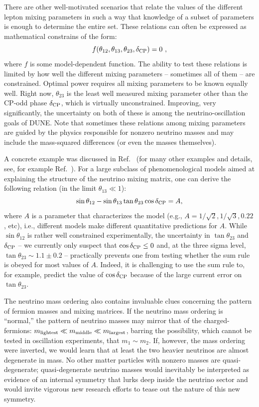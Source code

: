 There are other well-motivated scenarios that relate the values of the different lepton mixing parameters in such a way that knowledge of a subset of parameters is enough to determine the entire set. These relations can often be expressed as mathematical constrains of the form:
\begin{equation}
f(\theta_{12},\theta_{13}, \theta_{23}, \delta_{\rm CP})=0~,
\end{equation}
where $f$ is some model-dependent function. The ability to test these relations is limited by how well the different mixing parameters -- sometimes all of them -- are constrained. Optimal power requires all mixing parameters to be known equally well. Right now, $\theta_{23}$ is the least well measured mixing parameter other than the CP-odd phase $\delta_{\rm CP}$, which is virtually unconstrained. Improving, very significantly, the uncertainty on both of these is among the neutrino-oscillation goals of DUNE. Note that sometimes these relations among mixing parameters are guided by the physics responsible for nonzero neutrino masses and may include the mass-squared differences (or even the masses themselves).

A concrete example was discussed in Ref.~\cite{Antusch:2007rk} (for many other examples and details, see, for example Ref.~\cite{Ballett:2013wya}). For a large subclass of phenomenological models aimed at explaining the structure of the neutrino mixing matrix, one can derive the following relation (in the limit $\theta_{13}\ll 1$):
$$
\sin\theta_{12}-\sin\theta_{13}\tan\theta_{23}\cos\delta_{\rm CP} = A,
$$
where $A$ is a parameter that characterizes the model (e.g., $A=1/\sqrt{2}, 1/\sqrt{3}, 0.22$, etc), i.e., different models make different quantitative predictions for $A$.  While $\sin\theta_{12}$ is rather well constrained experimentally, the uncertainty in $\tan\theta_{23}$ and $\delta_{\rm CP}$ -- we currently only suspect that $\cos\delta_{\rm CP}\le0$ and, at the three sigma level, $\tan\theta_{23}\sim 1.1\pm0.2$ --  practically prevents one from testing whether the sum rule is obeyed for most values of $A$. Indeed, it is challenging to use the sum rule to, for example, predict the value of $\cos\delta_{\rm CP}$ because of the large current error on $\tan\theta_{23}$. 

The neutrino mass ordering also contains invaluable clues concerning the pattern of fermion masses and mixing matrices. If the neutrino mass ordering is ``normal,'' the pattern of neutrino masses may mirror that of the charged-fermions: $m_{\rm lightest}\ll m_{\rm middle}\ll m_{\rm largest}$, barring the possibility, which cannot be tested in oscillation experiments, that $m_1\sim m_2$. If, however, the mass ordering were inverted, we would learn that at least the two heavier neutrinos are almost degenerate in mass. No other matter particles with nonzero masses are quasi-degenerate; quasi-degenerate neutrino masses would inevitably be interpreted as evidence of an internal symmetry that lurks deep inside the neutrino sector and would invite vigorous new research efforts to tease out the nature of this new symmetry. 

